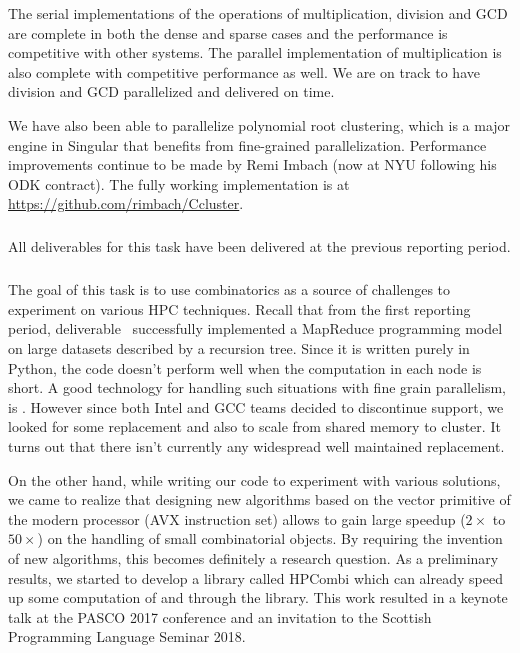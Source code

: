 The serial implementations of the operations of multiplication, division and GCD are complete in both the dense and sparse cases and the performance is competitive with other systems. The parallel implementation of multiplication is also complete with competitive performance as well. We are on track to have division and GCD parallelized and delivered on time.

We have also been able to parallelize polynomial root clustering, which is a
major engine in Singular that benefits from fine-grained
parallelization. Performance improvements continue to be made by Remi Imbach
(now at NYU following his ODK contract). The fully working implementation is
at \url{https://github.com/rimbach/Ccluster}.




  \subparagraph{}

  All deliverables for this task have been delivered at the previous
  reporting period.
  
  \subparagraph{}

  The goal of this task is to use combinatorics as a source of challenges to
  experiment on various HPC techniques. Recall that from the first reporting
  period, deliverable~ successfully
  implemented a MapReduce programming model on large datasets described by a
  recursion tree. Since it is written purely in Python, the code doesn't
  perform well when the computation in each node is short. A good technology
  for handling such situations with fine grain parallelism, is
  . However since both Intel and GCC teams decided to
  discontinue  support, we looked for some replacement and
  also to scale from shared memory to cluster. It turns out that there isn't
  currently any widespread well maintained replacement.

  On the other hand, while writing our code to experiment with various
  solutions, we came to realize that designing new algorithms based on the
  vector primitive of the modern processor (AVX instruction set) allows to
  gain large speedup ($2\times$ to $50\times$) on the handling of small
  combinatorial objects. By requiring the invention of new algorithms, this
  becomes definitely a research question. As a preliminary results, we started
  to develop a library called HPCombi which can already speed up some
  computation of  and  through the
   library. This work resulted in a keynote talk at the
  PASCO 2017 conference and an invitation to the Scottish Programming Language
  Seminar 2018.

